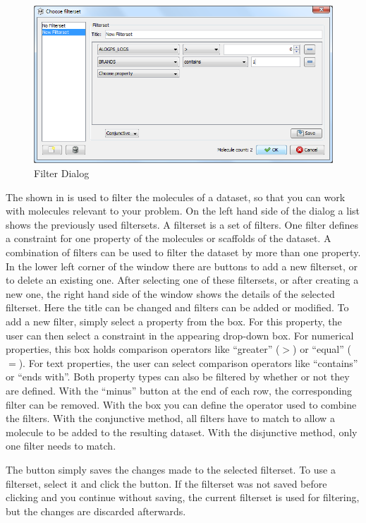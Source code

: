 \begin{figure}[ht]
   \centering
   \includegraphics[width=\textwidth]{images/sh_filter_dialog.png}
   \caption{Filter Dialog}
   \label{fig:filter_dialog}
\end{figure}

The  shown in  is used to filter the molecules of a dataset, so that you can work with molecules relevant to your problem.
On the left hand side of the dialog a list shows the previously used filtersets.
A filterset is a set of filters.
One filter defines a constraint for one property of the molecules or scaffolds of the dataset.
A combination of filters can be used to filter the dataset by more than one property.
In the lower left corner of the window there are buttons to add a new filterset, or to delete an existing one.
After selecting one of these filtersets, or after creating a new one, the right hand side of the window shows the details of the selected filterset.
Here the title can be changed and filters can be added or modified.
To add a new filter, simply select a property from the  box.
For this property, the user can then select a constraint in the appearing drop-down box.
For numerical properties, this box holds comparison operators like ``greater'' ({$>$}) or ``equal'' ($=$).
For text properties, the user can select comparison operators like ``contains'' or ``ends with''.
Both property types can also be filtered by whether or not they are defined.
With the ``minus'' button at the end of each row, the corresponding filter can be removed.
With the  box you can define the operator used to combine the filters.
With the conjunctive method, all filters have to match to allow a molecule to be added to the resulting dataset.
With the disjunctive method, only one filter needs to match.

The  button simply saves the changes made to the selected filterset.
To use a filterset, select it and click the  button.
If the filterset was not saved before clicking  and you continue without saving, the current filterset is used for filtering, but the changes are discarded afterwards.
